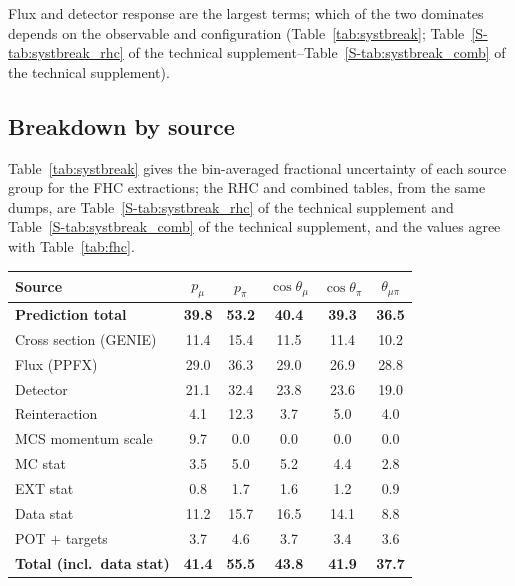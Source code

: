 \documentclass[11pt,a4paper]{article}
\newcommand{\suppref}[2]{#1~\ref{S-#2} of the technical supplement}
\begin{document}
Flux and detector response are the largest terms; which of the two dominates depends on the
observable and configuration (Table~\ref{tab:systbreak};
\suppref{Table}{tab:systbreak_rhc}--\suppref{Table}{tab:systbreak_comb}).

\subsection{Breakdown by source}

Table~\ref{tab:systbreak} gives the bin-averaged fractional uncertainty of each source group for the
FHC extractions; the RHC and combined tables, from the same dumps, are
\suppref{Table}{tab:systbreak_rhc} and \suppref{Table}{tab:systbreak_comb}, and the values agree
with Table~\ref{tab:fhc}.

\begin{center}\small
{}
\label{tab:systbreak}
\begin{tabular}{lccccc}
\toprule
Source & $p_\mu$ & $p_\pi$ & $\cos\theta_\mu$ & $\cos\theta_\pi$ & $\theta_{\mu\pi}$ \\
\midrule
\textbf{Prediction total} & \textbf{39.8} & \textbf{53.2} & \textbf{40.4} & \textbf{39.3} & \textbf{36.5} \\
Cross section (GENIE) & 11.4 & 15.4 & 11.5 & 11.4 & 10.2 \\
Flux (PPFX) & 29.0 & 36.3 & 29.0 & 26.9 & 28.8 \\
Detector & 21.1 & 32.4 & 23.8 & 23.6 & 19.0 \\
Reinteraction & 4.1 & 12.3 & 3.7 & 5.0 & 4.0 \\
MCS momentum scale & 9.7 & 0.0 & 0.0 & 0.0 & 0.0 \\
MC stat & 3.5 & 5.0 & 5.2 & 4.4 & 2.8 \\
EXT stat & 0.8 & 1.7 & 1.6 & 1.2 & 0.9 \\
Data stat & 11.2 & 15.7 & 16.5 & 14.1 & 8.8 \\
POT $+$ targets & 3.7 & 4.6 & 3.7 & 3.4 & 3.6 \\
\textbf{Total (incl.\ data stat)} & \textbf{41.4} & \textbf{55.5} & \textbf{43.8} & \textbf{41.9} & \textbf{37.7} \\
\bottomrule
\end{tabular}
\end{center}
\end{document}
